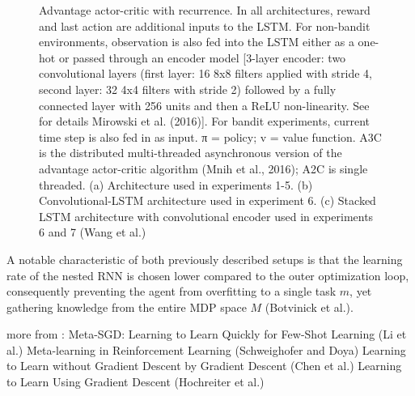 \documentclass[letterpaper, 10 pt, conference]{ieeeconf}  %
\begin{document}
\begin{figure}[thpb]
        \centering
  \caption{Advantage actor-critic with recurrence. In all architectures, reward and last action are additional inputs
        to the LSTM. For non-bandit environments, observation is also fed into the LSTM either as a one-hot or passed
        through an encoder model [3-layer encoder: two convolutional layers (first layer: 16 8x8 filters applied with
        stride 4, second layer: 32 4x4 filters with stride 2) followed by a fully connected layer with 256 units and then a
        ReLU non-linearity. See for details Mirowski et al. (2016)]. For bandit experiments, current time step is also
        fed in as input. π = policy; v = value function. A3C is the distributed multi-threaded asynchronous version
        of the advantage actor-critic algorithm (Mnih et al., 2016); A2C is single threaded. (a) Architecture used in
        experiments 1-5. (b) Convolutional-LSTM architecture used in experiment 6. (c) Stacked LSTM architecture
        with convolutional encoder used in experiments 6 and 7 (Wang et al.)}
        \label{figurelabel}
     \end{figure}
  

A notable characteristic of both previously described setups is that the learning rate of the nested RNN is chosen lower compared 
to the outer optimization loop, consequently preventing
the agent from overfitting to a single task $m$, yet gathering knowledge from the entire MDP space $M$ (Botvinick et al.).\newline


more from :  \newline
Meta-SGD: Learning to Learn Quickly for Few-Shot Learning (Li et al.) \newline
Meta-learning in Reinforcement Learning (Schweighofer and Doya) \newline
Learning to Learn without Gradient Descent by Gradient Descent (Chen et al.)
Learning to Learn Using Gradient Descent (Hochreiter et al.)
\end{document}
